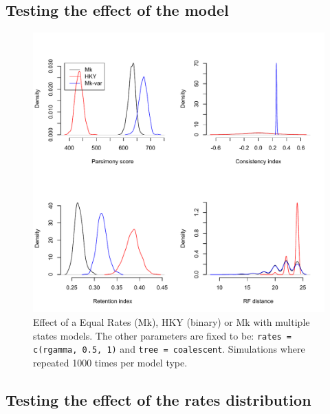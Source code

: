 \documentclass{article}\usepackage[]{graphicx}\usepackage[]{color}
\begin{document}
\newpage
\subsection{Testing the effect of the model}

\begin{figure}[!htbp]
\centering
   \includegraphics[width=1\textwidth]{Model_effect.pdf}
\caption{Effect of a Equal Rates (Mk), HKY (binary) or Mk with multiple states models.
The other parameters are fixed to be: \texttt{rates = c(rgamma, 0.5, 1)} and \texttt{tree = coalescent}.
Simulations where repeated 1000 times per model type.}
\label{Model_effect}
\end{figure}

\newpage
\subsection{Testing the effect of the rates distribution}
\end{document}
